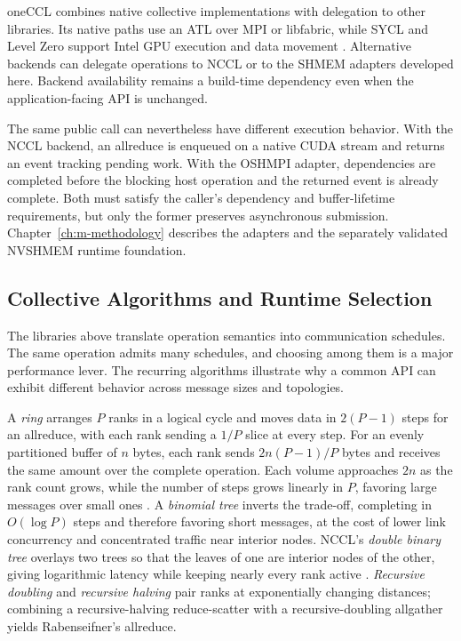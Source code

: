 oneCCL combines native collective implementations with delegation to other libraries. Its native paths use an \ac{ATL} over MPI or libfabric, while SYCL and Level Zero support Intel GPU execution and data movement \cite{unat_landscape_2026}. Alternative backends can delegate operations to NCCL or to the SHMEM adapters developed here. Backend availability remains a build-time dependency even when the application-facing API is unchanged.

The same public call can nevertheless have different execution behavior. With the NCCL backend, an allreduce is enqueued on a native CUDA stream and returns an event tracking pending work. With the OSHMPI adapter, dependencies are completed before the blocking host operation and the returned event is already complete. Both must satisfy the caller's dependency and buffer-lifetime requirements, but only the former preserves asynchronous submission. Chapter~\ref{ch:m-methodology} describes the adapters and the separately validated NVSHMEM runtime foundation.

\subsection{Collective Algorithms and Runtime Selection}\label{sec:collective-algorithms}

The libraries above translate operation semantics into communication schedules. The same operation admits many schedules, and choosing among them is a major performance lever. The recurring algorithms illustrate why a common API can exhibit different behavior across message sizes and topologies.

A \emph{ring} arranges $P$ ranks in a logical cycle and moves data in $2(P-1)$ steps for an allreduce, with each rank sending a $1/P$ slice at every step. For an evenly partitioned buffer of $n$ bytes, each rank sends $2n(P-1)/P$ bytes and receives the same amount over the complete operation. Each volume approaches $2n$ as the rank count grows, while the number of steps grows linearly in $P$, favoring large messages over small ones \cite{weingram_xccl_2023}. A \emph{binomial tree} inverts the trade-off, completing in $O(\log P)$ steps and therefore favoring short messages, at the cost of lower link concurrency and concentrated traffic near interior nodes. NCCL's \emph{double binary tree} overlays two trees so that the leaves of one are interior nodes of the other, giving logarithmic latency while keeping nearly every rank active \cite{weingram_xccl_2023,hu_demystifying_2025}. \emph{Recursive doubling} and \emph{recursive halving} pair ranks at exponentially changing distances; combining a recursive-halving reduce-scatter with a recursive-doubling allgather yields Rabenseifner's allreduce.

